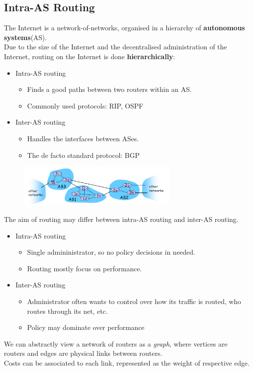 \documentclass[12pt]{article}
\theoremstyle{definition}
\begin{document}
\subsection{Intra-AS Routing}
The Internet is a network-of-networks, organised in a hierarchy of \textbf{autonomous systems}(AS). \\Due to the size of the Internet and the decentralised administration of the Internet, routing on the Internet is done \textbf{hierarchically}:
\begin{itemize}
  \item Intra-AS routing
  \begin{itemize}
    \item Finds a good paths between two routers within an AS.
    \item Commonly used protocols: RIP, OSPF
  \end{itemize}
  \item Inter-AS routing
  \begin{itemize}
    \item Handles the interfaces between ASes.
    \item The de facto standard protocol: BGP
  \end{itemize}
\end{itemize}
\begin{figure}[h]
\centering
\includegraphics[width = 0.7\textwidth]{7_2_1.png}
\end{figure}
The aim of routing may differ between intra-AS routing and inter-AS routing.
\begin{itemize}
  \item Intra-AS routing
  \begin{itemize}
    \item Single admininistrator, so no policy decisions in needed.
    \item Routing mostly focus on performance.
  \end{itemize}
  \item Inter-AS routing
  \begin{itemize}
    \item Administrator often wants to control over how its traffic is routed, who routes through its net, etc.
    \item Policy may dominate over performance
  \end{itemize}
\end{itemize}
We can abstractly view a network of routers as a \textit{graph}, where vertices are routers and edges are physical links between routers.\\
Costs can be associated to each link, represented as the weight of respective edge. 
\end{document}
